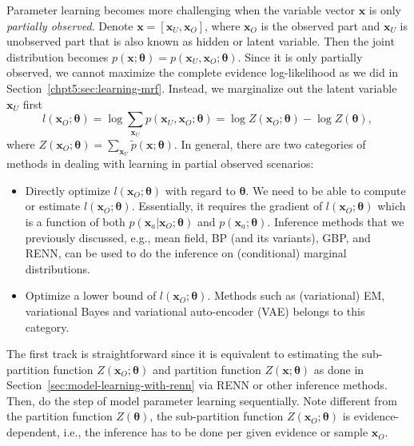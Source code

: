 Parameter learning becomes more challenging when the variable vector $\bm{x}$ is only \textit{partially observed}. Denote $\bm{x} = [\bm{x}_U, \bm{x}_O]$, where $\bm{x}_O$ is the observed part and $\bm{x}_U$ is unobserved part that is also known as hidden or latent variable. Then the joint distribution becomes $p(\bm{x}; \bm{\theta}) = p(\bm{x}_U, \bm{x}_O; \bm{\theta})$. Since it is only partially observed, we cannot maximize the complete evidence log-likelihood as we did in Section~\ref{chpt5:sec:learning-mrf}. Instead, we marginalize out the latent variable $\bm{x}_U$ first
\begin{equation}\label{chpt5:eq:patial-likelihood}
  l(\bm{x}_O; \bm{\theta}) = \log{\sum_{\bm{x}_U}p(\bm{x}_U, \bm{x}_O; \bm{\theta})} = \log{Z(\bm{x}_O;\bm{\theta})} - \log{Z(\bm{\theta})},
\end{equation}
where $Z(\bm{x}_O;\bm{\theta}) = \sum_{\bm{x}_U}\tilde{p}(\bm{x}; \bm{\theta})$. In general, there are two categories of methods in dealing with learning in partial observed scenarios:
\begin{itemize}
\item Directly optimize $l(\bm{x}_O; \bm{\theta})$ with regard to $\bm{\theta}$. We need to be able to compute or estimate $l(\bm{x}_O; \bm{\theta})$. Essentially, it requires the gradient of $l(\bm{x}_O; \bm{\theta})$ which is a function of both $p(\bm{x}_a| \bm{x}_O; \bm{\theta})$ and $p(\bm{x}_a; \bm{\theta})$. Inference methods that we previously discussed, e.g., mean field, BP (and its variants), GBP, and RENN, can be used to do the inference on (conditional) marginal distributions.
\item Optimize a lower bound of $l(\bm{x}_O; \bm{\theta})$. Methods such as (variational) EM, variational Bayes and variational auto-encoder (VAE) \cite{kingma2019vae} belongs to this category.
\end{itemize}

The first track is straightforward since it is equivalent to estimating the sub-partition function $Z(\bm{x}_O; \bm{\theta})$ and partition function $Z(\bm{x}; \bm{\theta})$ as done in Section~\ref{sec:model-learning-with-renn} via RENN or other inference methods. Then, do the step of model parameter learning sequentially. Note different from the partition function $Z(\bm{\theta})$, the sub-partition function $Z(\bm{x}_O; \bm{\theta})$ is evidence-dependent, i.e., the inference has to be done per given evidence or sample  $\bm{x}_O$. 

